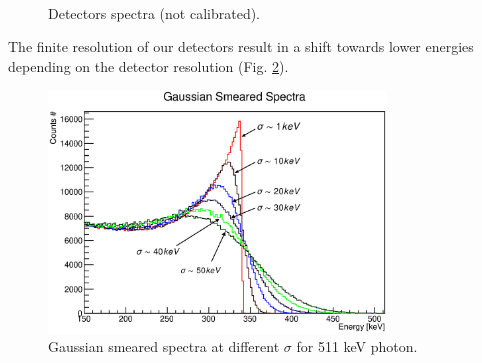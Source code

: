 \documentclass[a4paper,11pt]{article}
\begin{document}
\smallskip
\begin{figure}[h!]
\centering
{} \quad
{} \\
\caption{Detectors spectra (not calibrated).}
\label{fig: uncalibrated energy spectra}
\end{figure}
\clearpage
\noindent The finite resolution of our detectors result in a shift towards lower energies depending on the detector resolution (Fig. \ref{fig: smeared spectra}).
\begin{figure}[h!]
\centering
\includegraphics[width=0.8\textwidth]{smeared_spectra}
\caption{Gaussian smeared spectra at different $\sigma$ for 511 keV photon.}
\label{fig: smeared spectra}
\end{figure}
\end{document}
